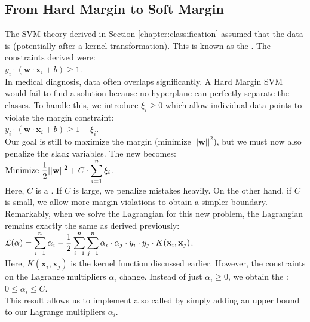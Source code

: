 \subsection{From Hard Margin to Soft Margin}
The SVM theory derived in Section \ref{chapter:classification} assumed that the data is  (potentially after a kernel transformation). This is known as the . The constraints derived were:
\\[0.2cm]
\hspace*{1.3cm}
$y_i \cdot(\mathbf{w} \cdot \mathbf{x}_i + b) \geq 1$.
\\[0.2cm]
In medical diagnosis, data often overlaps significantly. A Hard Margin SVM would fail to find a solution
because no hyperplane can perfectly separate the classes. To handle this, we introduce 
 $\xi_i \geq 0$ which allow individual data points to violate the margin constraint: 
\\[0.2cm]
\hspace*{1.3cm}
$y_i \cdot(\mathbf{w} \cdot \mathbf{x}_i + b) \geq 1 - \xi_i$.
\\[0.2cm]
Our goal is still to maximize the margin (minimize $||\mathbf{w}||^2$), but we must now also penalize the slack variables. The new  becomes:
\\[0.2cm]
\hspace*{1.3cm}
$\displaystyle \text{Minimize } \frac{1}{2}||\mathbf{w}||^2 + C \cdot \sum_{i=1}^n \xi_i$.
\\[0.2cm]
Here, $C$ is a .  If $C$ is large, we penalize mistakes heavily.
On the other hand, if $C$ is small, we allow more margin violations to obtain a simpler boundary.
Remarkably, when we solve the Lagrangian for this new problem, the Lagrangian remains
exactly the same as derived previously: 
\\[0.2cm]
\hspace*{1.3cm}
$\displaystyle \mathcal{L}(\alpha) =
\sum_{i=1}^n \alpha_i - \frac{1}{2} \sum_{i=1}^n \sum_{j=1}^n \alpha_i \cdot\alpha_j\cdot y_i\cdot y_j\cdot
K(\mathbf{x}_i, \mathbf{x}_j)$.
\\[0.2cm]
Here, $K(\mathbf{x}_i, \mathbf{x}_j)$ is the kernel function discussed earlier.
However, the constraints on the Lagrange multipliers $\alpha_i$ change. Instead of just $\alpha_i \geq 0$, we
obtain the : 
\\[0.2cm]
\hspace*{1.3cm}
$0 \leq \alpha_i \leq C$.
\\[0.2cm]
This result allows us to implement a so called  
by simply adding an upper bound to our Lagrange multipliers $\alpha_i$.

